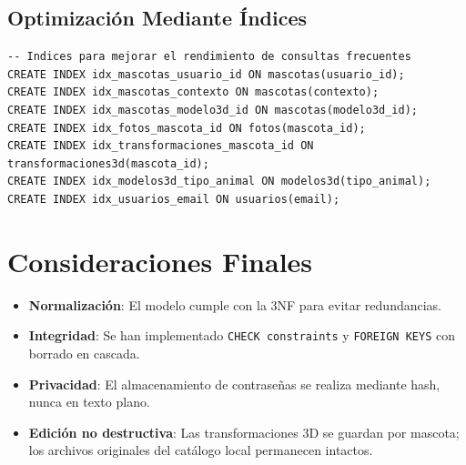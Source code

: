\documentclass[12pt,a4paper]{article}
\begin{document}
\subsection{Optimización Mediante Índices}
\begin{lstlisting}
-- Indices para mejorar el rendimiento de consultas frecuentes
CREATE INDEX idx_mascotas_usuario_id ON mascotas(usuario_id);
CREATE INDEX idx_mascotas_contexto ON mascotas(contexto);
CREATE INDEX idx_mascotas_modelo3d_id ON mascotas(modelo3d_id);
CREATE INDEX idx_fotos_mascota_id ON fotos(mascota_id);
CREATE INDEX idx_transformaciones_mascota_id ON transformaciones3d(mascota_id);
CREATE INDEX idx_modelos3d_tipo_animal ON modelos3d(tipo_animal);
CREATE INDEX idx_usuarios_email ON usuarios(email);
\end{lstlisting}

\section{Consideraciones Finales}
\begin{itemize}[label=\color{AccentBlue}\checkmark, leftmargin=*]
    \item \textbf{Normalización}: El modelo cumple con la 3NF para evitar redundancias.
    \item \textbf{Integridad}: Se han implementado \texttt{CHECK constraints} y \texttt{FOREIGN KEYS} con borrado en cascada.
    \item \textbf{Privacidad}: El almacenamiento de contraseñas se realiza mediante hash, nunca en texto plano.
    \item \textbf{Edición no destructiva}: Las transformaciones 3D se guardan por mascota; los archivos originales del catálogo local permanecen intactos.
\end{itemize}
\end{document}
